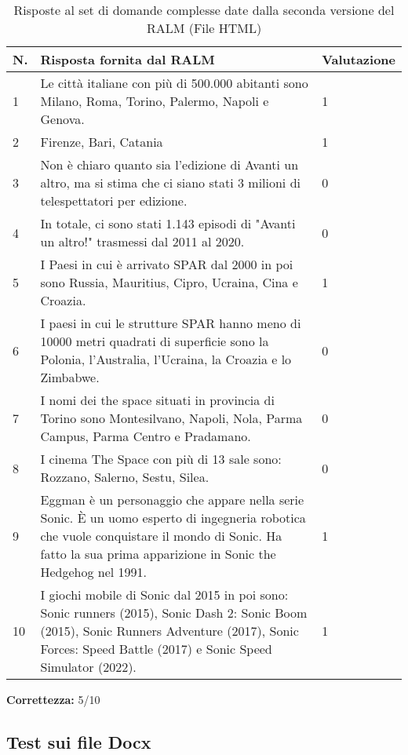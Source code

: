 \begin{table}[H]
    \centering
    \begin{tabular}{|p{0.5cm} |p{6cm} |p{2cm}|}
        \hline
        \textbf{N}. & \textbf{Risposta fornita dal RALM} & \textbf{Valutazione} \\
        \hline
        1 & Le città italiane con più di 500.000 abitanti sono Milano, Roma, Torino, Palermo, Napoli e Genova. & 1 \\
        \hline
        2 & Firenze, Bari, Catania & 1 \\
        \hline
        3 & Non è chiaro quanto sia l'edizione di Avanti un altro, ma si stima che ci siano stati 3 milioni di telespettatori per edizione. & 0 \\
        \hline
        4 & In totale, ci sono stati 1.143 episodi di "Avanti un altro!" trasmessi dal 2011 al 2020. & 0 \\
        \hline
        5 & I Paesi in cui è arrivato SPAR dal 2000 in poi sono Russia, Mauritius, Cipro, Ucraina, Cina e Croazia. & 1 \\
        \hline
        6 & I paesi in cui le strutture SPAR hanno meno di 10000 metri quadrati di superficie sono la Polonia, l'Australia, l'Ucraina, la Croazia e lo Zimbabwe. & 0 \\
        \hline
        7 & I nomi dei the space situati in provincia di Torino sono Montesilvano, Napoli, Nola, Parma Campus, Parma Centro e Pradamano. & 0 \\
        \hline
        8 & I cinema The Space con più di 13 sale sono: Rozzano, Salerno, Sestu, Silea. & 0 \\
        \hline
        9 & Eggman è un personaggio che appare nella serie Sonic. È un uomo esperto di ingegneria robotica che vuole conquistare il mondo di Sonic. Ha fatto la sua prima apparizione in Sonic the Hedgehog nel 1991.  & 1 \\
        \hline
        10 & I giochi mobile di Sonic dal 2015 in poi sono: Sonic runners (2015), Sonic Dash 2: Sonic Boom (2015), Sonic Runners Adventure (2017), Sonic Forces: Speed Battle (2017) e Sonic Speed Simulator (2022). & 1 \\
        \hline
    \end{tabular}
    \caption{Risposte al set di domande complesse date dalla seconda versione del RALM (File HTML)}
\end{table}

\textbf{Correttezza:} 5/10

\subsection{Test sui file Docx}

